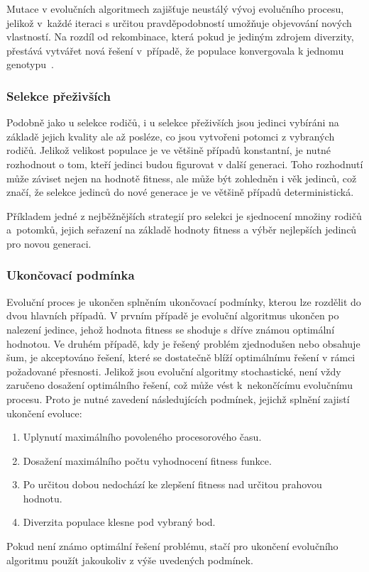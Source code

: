 Mutace v evolučních algoritmech zajišťuje neustálý vývoj evolučního procesu, jelikož v~každé iteraci s určitou pravděpodobností umožňuje objevování nových vlastností. 
Na rozdíl od rekombinace, která pokud je jediným zdrojem diverzity, přestává vytvářet nová řešení v~případě, že populace konvergovala k jednomu genotypu~\cite{NaturalComputing}. 

\subsubsection*{Selekce přeživších}
Podobně jako u selekce rodičů, i u selekce přeživších jsou jedinci vybíráni na základě jejich kvality ale až posléze, co jsou vytvořeni potomci z vybraných rodičů. 
Jelikož velikost populace je ve většině případů konstantní, je nutné rozhodnout o tom, kteří jedinci budou figurovat v další generaci. 
Toho rozhodnutí může záviset nejen na hodnotě fitness, ale může být zohledněn i věk jedinců, což značí, že selekce jedinců do nové generace je ve většině případů deterministická. 

Příkladem jedné z nejběžnějších strategií pro selekci je sjednocení množiny rodičů a~potomků, jejich seřazení na základě hodnoty fitness a výběr nejlepších jedinců pro novou generaci. 

\subsubsection*{Ukončovací podmínka}
Evoluční proces je ukončen splněním ukončovací podmínky, kterou lze rozdělit do dvou hlavních případů. 
V prvním případě je evoluční algoritmus ukončen po nalezení jedince, jehož hodnota fitness se shoduje s dříve známou optimální hodnotou. 
Ve druhém případě, kdy je řešený problém zjednodušen nebo obsahuje šum, je akceptováno řešení, které se dostatečně blíží optimálnímu řešení v rámci požadované přesnosti. 
Jelikož jsou evoluční algoritmy stochastické, není vždy zaručeno dosažení optimálního řešení, což může vést k~nekončícímu evolučnímu procesu.
Proto je nutné zavedení následujících podmínek, jejichž splnění zajistí ukončení evoluce:
\begin{enumerate}
    \item Uplynutí maximálního povoleného procesorového času.
    \item Dosažení maximálního počtu vyhodnocení fitness funkce. 
    \item Po určitou dobou nedochází ke zlepšení fitness nad určitou prahovou hodnotu.
    \item Diverzita populace klesne pod vybraný bod.
\end{enumerate}
Pokud není známo optimální řešení problému, stačí pro ukončení evolučního algoritmu použít jakoukoliv z výše uvedených podmínek. 

